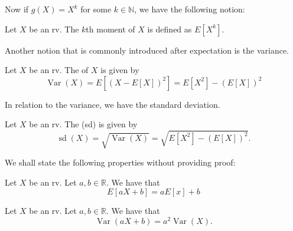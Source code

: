 \documentclass[notoc,notitlepage]{tufte-book}
\DeclareMathOperator{\Var}{Var }
\DeclareMathOperator{\sd}{sd }
\begin{document}
Now if $g(X) = X^k$ for some $k \in \mathbb{N}$, we have the following notion:

\begin{defn}[Moment]
\label{defn:moment}
  Let $X$ be an rv. The $k$th moment of $X$ is defined as $E[ X^k ]$.
\end{defn}

Another notion that is commonly introduced after expectation is the variance.

\begin{defn}[Variance]
\label{defn:variance}
  Let $X$ be an rv. The  of $X$ is given by
  \begin{equation*}
    \Var(X) = E[ (X - E[X])^2 ] = E[ X^2 ] - ( E[X] )^2
  \end{equation*}
\end{defn}

In relation to the variance, we have the standard deviation.

\begin{defn}
\label{defn:standard_deviation}
  Let $X$ be an rv. The  (sd) is given by
  \begin{equation*}
    \sd(X) = \sqrt{\Var(X)} = \sqrt{ E[X^2] - (E[X])^2 }.
  \end{equation*}
\end{defn}

We shall state the following properties without providing proof:

\begin{propo}
\label{propo:linearity_of_the_expectation}
  Let $X$ be an rv. Let $a, b \in \mathbb{R}$. We have that
  \begin{equation*}
    E[ aX + b ] = aE[x] + b
  \end{equation*}
\end{propo}

\begin{propo}
\label{propo:linearity_of_the_variance}
  Let $X$ be an rv. Let $a, b \in \mathbb{R}$. We have that
  \begin{equation*}
    \Var(aX + b) = a^2 \Var(X).
  \end{equation*}
\end{propo}
\end{document}

